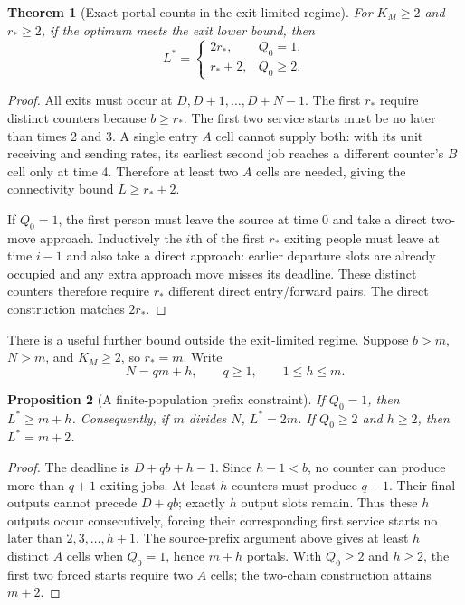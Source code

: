 \documentclass[11pt]{article}
\newtheorem{theorem}{Theorem}
\newtheorem{proposition}[theorem]{Proposition}
\begin{document}
\begin{theorem}[Exact portal counts in the exit-limited regime]
For $K_M\ge2$ and $r_*\ge2$, if the optimum meets the exit lower bound, then
\[
 L^*=\begin{cases}
 2r_*,&Q_0=1,\\
 r_*+2,&Q_0\ge2.
 \end{cases}
\]
\end{theorem}
\begin{proof}
All exits must occur at $D,D+1,\ldots,D+N-1$. The first $r_*$ require distinct counters because $b\ge r_*$. The first two service starts must be no later than times 2 and 3. A single entry $A$ cell cannot supply both: with its unit receiving and sending rates, its earliest second job reaches a different counter's $B$ cell only at time 4. Therefore at least two $A$ cells are needed, giving the connectivity bound $L\ge r_*+2$.

If $Q_0=1$, the first person must leave the source at time 0 and take a direct two-move approach. Inductively the $i$th of the first $r_*$ exiting people must leave at time $i-1$ and also take a direct approach: earlier departure slots are already occupied and any extra approach move misses its deadline. These distinct counters therefore require $r_*$ different direct entry/forward pairs. The direct construction matches $2r_*$.
\end{proof}

There is a useful further bound outside the exit-limited regime. Suppose $b>m$, $N>m$, and $K_M\ge2$, so $r_*=m$. Write
\[
 N=qm+h,\qquad q\ge1,\qquad 1\le h\le m.
\]

\begin{proposition}[A finite-population prefix constraint]
If $Q_0=1$, then $L^*\ge m+h$. Consequently, if $m$ divides $N$, $L^*=2m$. If $Q_0\ge2$ and $h\ge2$, then $L^*=m+2$.
\end{proposition}
\begin{proof}
The deadline is $D+qb+h-1$. Since $h-1<b$, no counter can produce more than $q+1$ exiting jobs. At least $h$ counters must produce $q+1$. Their final outputs cannot precede $D+qb$; exactly $h$ output slots remain. Thus these $h$ outputs occur consecutively, forcing their corresponding first service starts no later than $2,3,\ldots,h+1$. The source-prefix argument above gives at least $h$ distinct $A$ cells when $Q_0=1$, hence $m+h$ portals. With $Q_0\ge2$ and $h\ge2$, the first two forced starts require two $A$ cells; the two-chain construction attains $m+2$.
\end{proof}
\end{document}
